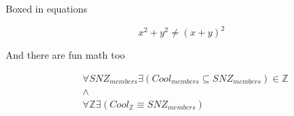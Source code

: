 Boxed in equations

\begin{equation}
    \boxed{
    x^2+y^2
    \neq (x + y)^2
    }
\end{equation}

And there are fun math too

\begin{align*}
    &\forall SNZ_{members} \exists (Cool_{members}  \subseteq SNZ_{members}) \in \mathbb{Z} \\
    &\land \\
    &\forall \mathbb{Z} \exists (Cool_{\mathbb{Z}}  \equiv SNZ_{members})
\end{align*}